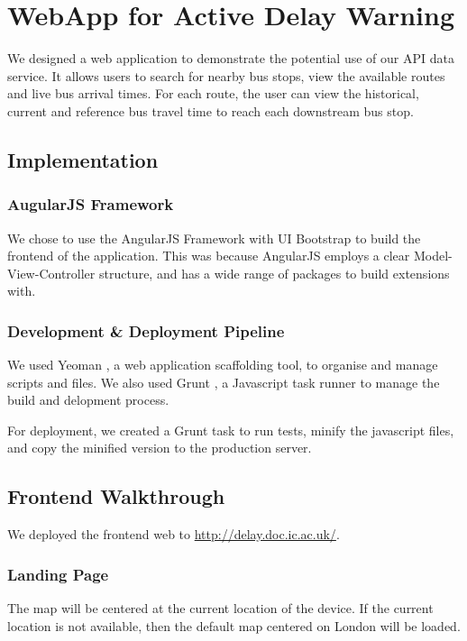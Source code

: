 \chapter{WebApp for Active Delay Warning}
\label{ch:mobile_app}

\par We designed a web application to demonstrate the potential use of our API data service. It allows users to search for nearby bus stops, view the available routes and live bus arrival times. For each route, the user can view the historical, current and reference bus travel time to reach each downstream bus stop.

\section{Implementation}
\subsection{AugularJS Framework}
\par We chose to use the AngularJS Framework \cite{angularjs} with UI Bootstrap \cite{bootstrap} to build the frontend of the application. This was because AngularJS employs a clear Model-View-Controller structure, and has a wide range of packages to build extensions with.

\subsection{Development \& Deployment Pipeline}
\par We used Yeoman \cite{yeoman}, a web application scaffolding tool, to organise and manage scripts and files. We also used Grunt \cite{grunt}, a Javascript task runner to manage the build and delopment process.

\par For deployment, we created a Grunt task to run tests, minify the javascript files, and copy the minified version to the production server.

\section{Frontend Walkthrough}
\par We deployed the frontend web to \url{http://delay.doc.ic.ac.uk/}.


\subsection{Landing Page}
\par The map will be centered at the current location of the device. If the current location is not available, then the default map centered on London will be loaded.


